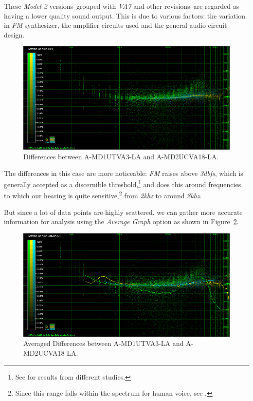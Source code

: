 \documentclass[10pt,a4paper]{report}
\newcommand{\khz}[1]{\textit{\mbox{#1\acrshort{khz}}}}
\newcommand{\db}[1]{\textit{\mbox{#1\acrshort{dbfs}}}}
\begin{document}
These \textit{Model 2} versions--grouped with \textit{VA7} and other revisions--are regarded as having a lower quality sound output. This is due to various factors: the variation in \textit{FM} synthesizer, the amplifier circuits used and the general audio circuit design.

\begin{figure}[H]
	\centering
	\includegraphics[width=1.0\linewidth]{images/results/5-1-A-MD1UTVA3-LA_vs_A-MD2UCVA18-LA.png}
	\caption[A-MD1UTVA3-LA vs A-MD2UCVA18-LA]{Differences between A-MD1UTVA3-LA and A-MD2UCVA18-LA.}
	\label{fig:A-MD1UTVA3-LA_vs_A-MD2UCVA18-LA}
\end{figure}

The differences in this case are more noticeable: \textit{FM} raises above \db{3}, which is generally accepted as a discernible threshold,\footnote{See \cite{dbdiff} for results from different studies.} and does this around frequencies to which our hearing is quite sensitive,\footnote{Since this range falls within the spectrum for human voice, see \cite{humanvoice}.} from \khz{2} to around \khz{8}.

But since a lot of data points are highly scattered, we can gather more accurate information for analysis using the \textit{Average Graph} option as shown in Figure~\ref{fig:A-MD1UTVA3-LA_vs_A-MD2UCVA18-LA_AVG}.

\begin{figure}[H]
	\centering
	\includegraphics[width=1.0\linewidth]{images/results/5-2-A-MD1UTVA3-LA_vs_A-MD2UCVA18-LA.png}
	\caption[A-MD1UTVA3-LA vs A-MD2UCVA18-LA Averaged]{Averaged Differences between A-MD1UTVA3-LA and A-MD2UCVA18-LA.}
	\label{fig:A-MD1UTVA3-LA_vs_A-MD2UCVA18-LA_AVG}
\end{figure}
\end{document}
